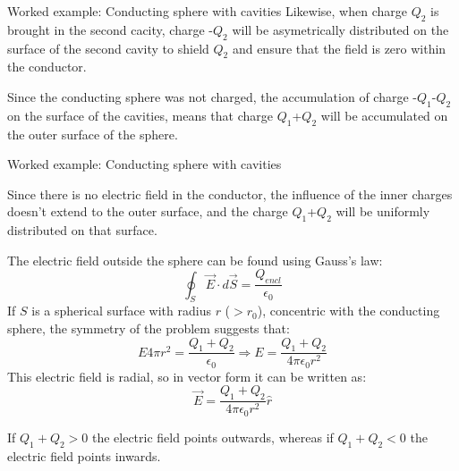 {\begin{frame}{Worked example: Conducting sphere with cavities}
  Likewise, when charge $Q_2$ is brought in the second cacity,
  charge -$Q_2$ will be asymetrically distributed on the surface of the
  second cavity to shield $Q_2$ and ensure that the field is zero within the
  conductor.\\
  \vspace{0.2cm}

  Since the conducting sphere was not charged, the accumulation of charge
  -$Q_1$-$Q_2$ on the surface of the cavities, means that charge $Q_1$+$Q_2$
  will be accumulated on the outer surface of the sphere.\\

\end{frame}

%
%
%

\begin{frame}{Worked example: Conducting sphere with cavities}

  Since there is no electric field in the conductor, the influence of the
  inner charges doesn't extend to the outer surface, and the charge
  $Q_1$+$Q_2$ will be uniformly distributed on that surface.\\
  \vspace{0.1cm}

  The electric field outside the sphere can be found using
  Gauss's law:
   \begin{equation*}
     \oint_{S} \vec{E} \cdot d\vec{S} = \frac{Q_{encl}}{\epsilon_0}
   \end{equation*}
  If $S$ is a spherical surface with radius $r$ ($>r_0$),
  concentric with the conducting sphere, the symmetry of the problem
  suggests that:
  \begin{equation*}
    E 4\pi r^2 = \frac{Q_1 + Q_2}{\epsilon_0} \Rightarrow
    E = \frac{Q_1 + Q_2}{4\pi \epsilon_0 r^2}
  \end{equation*}
  This electric field is radial, so in vector form it can be written as:
  \begin{equation*}
    \vec{E} = \frac{Q_1 + Q_2}{4\pi \epsilon_0 r^2} \hat{r}
  \end{equation*}

  If $Q_1 + Q_2 > 0$ the electric field points outwards, whereas
  if $Q_1 + Q_2 < 0$ the electric field points inwards.

\end{frame}

} %


